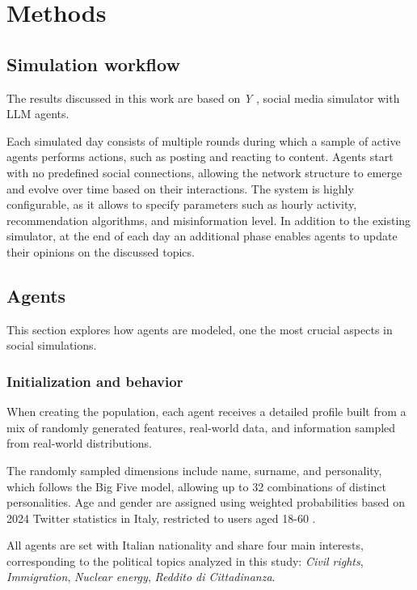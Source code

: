 \section{Methods}
\label{sec:methods}

\subsection{Simulation workflow}
The results discussed in this work are based on \textit{Y} \cite{rossetti2024ysocialllmpoweredsocial}, social media simulator with LLM agents. 

Each simulated day consists of multiple rounds during which a sample of active agents performs actions, such as posting and reacting to content.
Agents start with no predefined social connections, allowing the network structure to emerge and evolve over time based on their interactions. 
The system is highly configurable, as it allows to specify parameters such as hourly activity, recommendation algorithms, and misinformation level.
In addition to the existing simulator, at the end of each day an additional phase enables agents to update their opinions on the discussed topics.


\subsection{Agents}

This section explores how agents are modeled, one the most crucial aspects in social simulations.

\subsubsection{Initialization and behavior}
When creating the population, each agent receives a detailed profile built from a mix of randomly generated features, real-world data, and information sampled from real-world distributions.

The randomly sampled dimensions include name, surname, and personality, which follows the Big Five model, allowing up to 32 combinations of distinct personalities.
Age and gender are assigned using weighted probabilities based on 2024 Twitter statistics in Italy, restricted to users aged 18-60 \cite{statista2024twitter}.

All agents are set with Italian nationality and share four main interests, corresponding to the political topics analyzed in this study: \textit{Civil rights}, \textit{Immigration}, \textit{Nuclear energy}, \textit{Reddito di Cittadinanza}.

